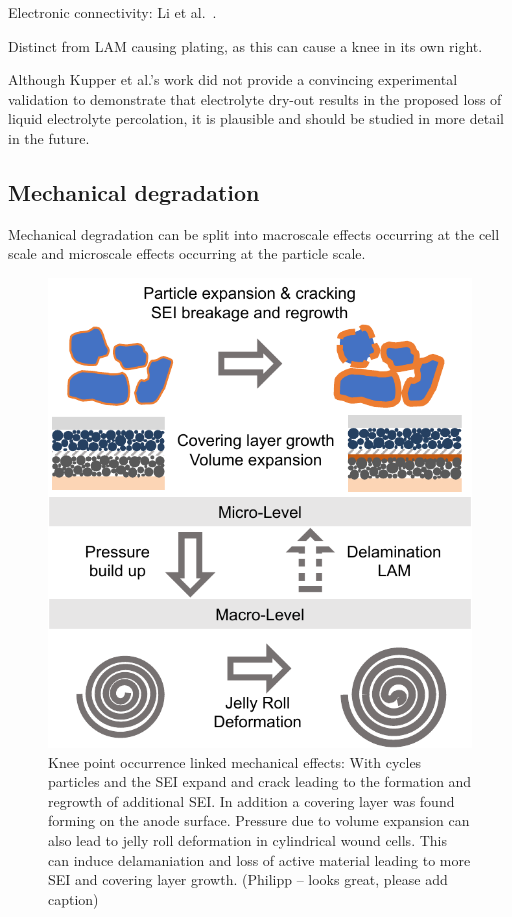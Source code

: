 \documentclass{article}
\begin{document}
Electronic connectivity: Li et al.~\cite{li_effects_2015}.

Distinct from LAM causing plating, as this can cause a knee in its own right.

Although Kupper et al.'s work did not provide a convincing experimental validation to demonstrate that electrolyte dry-out results in the proposed loss of liquid electrolyte percolation, it is plausible and should be studied in more detail in the future. 

\subsection{Mechanical degradation}

Mechanical degradation can be split into macroscale effects occurring at the cell scale and microscale effects occurring at the particle scale.

\begin{figure}[ht]
\centering
\includegraphics[scale = 0.7]{figures/MechanicalKneepoints.pdf}
\caption{Knee point occurrence linked mechanical effects: With cycles particles and the SEI expand and crack leading to the formation and regrowth of additional SEI. In addition a covering layer was found forming on the anode surface. Pressure due to volume expansion can also lead to jelly roll deformation in cylindrical wound cells. This can induce delamaniation and loss of active material leading to more SEI and covering layer growth. (Philipp -- looks great, please add caption)}
\label{fig:knee_mechanical}
\end{figure}
\end{document}
